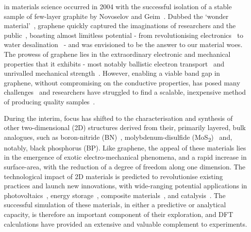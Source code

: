 
in materials science occurred in 2004  
with the successful isolation of a 
stable sample of few-layer graphite 
by Novoselov and Geim~\cite{Novoselov666}.
%
Dubbed the `wonder material'~\cite{Geim1530,2058-7058-22-08-33},
graphene quickly captured the imaginations 
of researchers and the public~\cite{Geim2007,graphenetheguardian,doi:10.1021/cr900070d}, 
boasting almost limitless potential 
- from revolutionising electronics~\cite{Geim2007,RevModPhys.81.109} 
to water desalination~\cite{MISHRA201139} - 
and was envisioned to be 
the answer to our material woes.
%
The prowess of graphene 
lies in the extraordinary 
electronic and mechanical properties 
that it exhibits 
- most notably 
ballistic electron transport~\cite{RevModPhys.81.109}  
and unrivalled mechanical strength~\cite{PhysRevB.76.064120}.
%
However, enabling a viable band gap in graphene, 
without compromising on the 
conductive properties, 
has posed many challenges~\cite{2053-1613-1-2-020204}
and 
researchers have struggled to 
find a scalable, inexpensive 
method of producing quality samples~\cite{C5TA00252D}.

%
During the interim, 
focus has shifted to the 
characterisation and synthesis of other 
two-dimensional (2D) structures 
derived from their, 
primarily layered, bulk analogues,
such as
boron-nitride (BN)~\cite{PhysRevB.76.073103,R.2010,PENG201211,doi:10.1021/nl1022139}, 
molybdenum-disulfide (MoS\textsubscript{2})~\cite{doi:10.1021/nl903868w,RadisavljevicB.2011,ANIE:ANIE201000009} 
and, notably, black phosphorus (BP).
%
Like graphene, 
the appeal of these materials 
lies in the emergence of 
exotic electro-mechanical phenomena, 
and a rapid increase in surface-area, 
with the reduction of a degree of freedom  
along one dimension.
%
The technological 
impact of 2D materials 
is predicted to 
revolutionise existing practices 
and launch new innovations,
with wide-ranging potential applications in 
photovoltaics~\cite{Xie2016433,doi:10.1021/nl401544y,ADMA:ADMA200800366,doi:10.1063/1.3204698,Wang2012}, 
energy storage~\cite{ADMA:ADMA200602592,doi:10.1021/jp302265n,Sun2015,Bonaccorso1246501,doi:10.1021/nl800957b,ADMA:ADMA200903328,doi:10.1021/nl802484w}, 
composite materials~\cite{PMID:26469634,doi:10.1021/nl501617j},
and catalysis~\cite{ADMA:ADMA201204453,ADFM:ADFM201505380,ANIE:ANIE201307475}.
%
The successful simulation of these materials, 
in either a predictive or analytical capacity, 
is therefore an important component of their exploration, 
and DFT calculations have provided  
an extensive and valuable 
complement to experiments.
%

